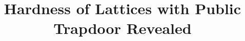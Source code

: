 \documentclass{llncs}
\title{Hardness of Lattices with Public Trapdoor Revealed}
\begin{document}

\maketitle
\thispagestyle{empty}
\begin{abstract}
  


\end{abstract}


\clearpage
{} 
% 
% 

%
% 
% 
% 
% 



%
%




%
\end{document}
